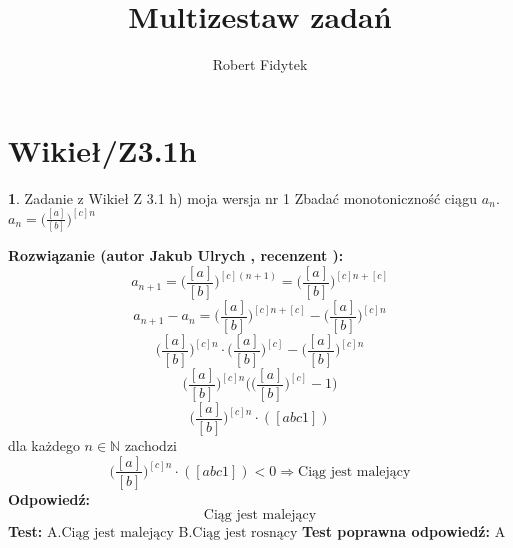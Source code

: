 \documentclass[12pt, a4paper]{article}
\title{Multizestaw zadań}
\author{Robert Fidytek}
\date{}
\theoremstyle{definition} %
\newtheorem{zad}{}
\newcommand{\kategoria}[1]{\section{#1}} %
\newcommand{\zadStart}[1]{\begin{zad}#1\newline} %
\newcommand{\zadStop}{\end{zad}}   %
\newcommand{\rozwStart}[2]{\noindent \textbf{Rozwiązanie (autor #1 , recenzent #2): }\newline} %
\newcommand{\rozwStop}{\newline}                                            %
\newcommand{\odpStart}{\noindent \textbf{Odpowiedź:}\newline}    %
\newcommand{\odpStop}{\newline}                                             %
\newcommand{\testStart}{\noindent \textbf{Test:}\newline} %
\newcommand{\testStop}{\newline} %
\newcommand{\kluczStart}{\noindent \textbf{Test poprawna odpowiedź:}\newline} %
\newcommand{\kluczStop}{\newline} %
\begin{document}
\maketitle


\kategoria{Wikieł/Z3.1h}
\zadStart{Zadanie z Wikieł Z 3.1 h) moja wersja nr 1}
Zbadać monotoniczność ciągu $a_{n}$.\\ $a_{n}=\big(\frac{[a]}{[b]}\big)^{[c]n}$
\zadStop
\rozwStart{Jakub Ulrych}{}
$$a_{n+1}=\bigg(\frac{[a]}{[b]}\bigg)^{[c](n+1)}=\bigg(\frac{[a]}{[b]}\bigg)^{[c]n+[c]}$$
$$a_{n+1}-a_{n}=\bigg(\frac{[a]}{[b]}\bigg)^{[c]n+[c]}-\bigg(\frac{[a]}{[b]}\bigg)^{[c]n}$$
$$\bigg(\frac{[a]}{[b]}\bigg)^{[c]n}\cdot\bigg(\frac{[a]}{[b]}\bigg)^{[c]}-\bigg(\frac{[a]}{[b]}\bigg)^{[c]n}$$
$$\bigg(\frac{[a]}{[b]}\bigg)^{[c]n}\bigg(\bigg(\frac{[a]}{[b]}\bigg)^{[c]}-1\bigg)$$
$$\bigg(\frac{[a]}{[b]}\bigg)^{[c]n}\cdot ([abc1])$$
dla każdego $n\in\mathbb{N}$ zachodzi
$$\bigg(\frac{[a]}{[b]}\bigg)^{[c]n}\cdot ([abc1])<0\Rightarrow \text{Ciąg jest malejący}$$
\rozwStop
\odpStart
$$\text{Ciąg jest malejący}$$
\odpStop
\testStart
A.$\text{Ciąg jest malejący}$
B.$\text{Ciąg jest rosnący}$
\testStop
\kluczStart
A
\kluczStop
\end{document}
